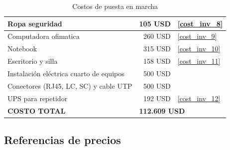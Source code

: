 \documentclass[12pt,a4paper]{book}
\begin{document}
\begin{table}[H]
\begin{tabular}{|l|l|l|}
    \hline
    Ropa seguridad & \multicolumn{1}{r|}{                  105 USD } & \ref{cost_inv_8} \\
    \hline
    Computadora ofimatica & \multicolumn{1}{r|}{                  260 USD } & \ref{cost_inv_9} \\
    \hline
    Notebook & \multicolumn{1}{r|}{                  315 USD } & \ref{cost_inv_10} \\
    \hline
    Escritorio y silla & \multicolumn{1}{r|}{                  158 USD } & \ref{cost_inv_11} \\
    \hline
    Instalación eléctrica cuarto de equipos & \multicolumn{1}{r|}{                  500 USD } &  \\
    \hline
    Conectores (RJ45, LC, SC) y cable UTP & \multicolumn{1}{r|}{                  500 USD } &  \\
    \hline
    UPS para repetidor & \multicolumn{1}{r|}{                  192 USD } & \ref{cost_inv_12} \\
    \hline
    \textbf{COSTO TOTAL} & \multicolumn{2}{l|}{\textbf{                                                               112.609 USD }} \\
    \hline
    \end{tabular}%
    \caption{Costos de puesta en marcha}
  \label{tab_costo_puesta_marcha}%
\end{table}%


\subsection{Referencias de precios}
\end{document}
